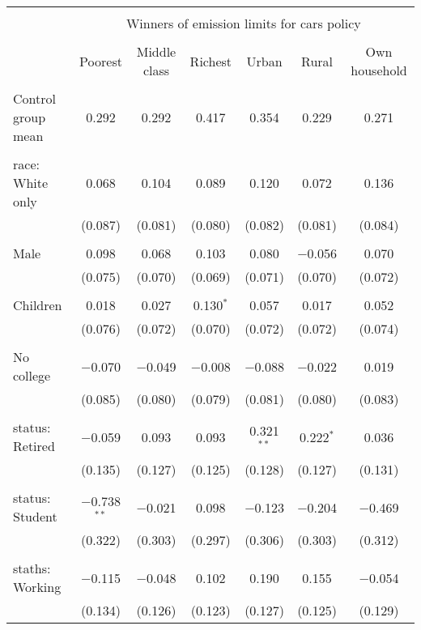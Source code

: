 
\begin{tabular}{@{\extracolsep{5pt}}lcccccc} 
\\[-1.8ex]\hline 
\hline \\[-1.8ex] 
 & \multicolumn{6}{c}{Winners of emission limits for cars policy} \\ 
\cline{2-7} 
\\[-1.8ex] & Poorest & Middle class & Richest & Urban & Rural & Own household \\ 
\hline \\[-1.8ex] 
 Control group mean & 0.292 & 0.292 & 0.417 & 0.354 & 0.229 & 0.271  \\ \hline \\[-1.8ex] race: White only & 0.068 & 0.104 & 0.089 & 0.120 & 0.072 & 0.136 \\ 
  & (0.087) & (0.081) & (0.080) & (0.082) & (0.081) & (0.084) \\ 
  & & & & & & \\ 
 Male & 0.098 & 0.068 & 0.103 & 0.080 & $-$0.056 & 0.070 \\ 
  & (0.075) & (0.070) & (0.069) & (0.071) & (0.070) & (0.072) \\ 
  & & & & & & \\ 
 Children & 0.018 & 0.027 & 0.130$^{*}$ & 0.057 & 0.017 & 0.052 \\ 
  & (0.076) & (0.072) & (0.070) & (0.072) & (0.072) & (0.074) \\ 
  & & & & & & \\ 
 No college & $-$0.070 & $-$0.049 & $-$0.008 & $-$0.088 & $-$0.022 & 0.019 \\ 
  & (0.085) & (0.080) & (0.079) & (0.081) & (0.080) & (0.083) \\ 
  & & & & & & \\ 
 status: Retired & $-$0.059 & 0.093 & 0.093 & 0.321$^{**}$ & 0.222$^{*}$ & 0.036 \\ 
  & (0.135) & (0.127) & (0.125) & (0.128) & (0.127) & (0.131) \\ 
  & & & & & & \\ 
 status: Student & $-$0.738$^{**}$ & $-$0.021 & 0.098 & $-$0.123 & $-$0.204 & $-$0.469 \\ 
  & (0.322) & (0.303) & (0.297) & (0.306) & (0.303) & (0.312) \\ 
  & & & & & & \\ 
 staths: Working & $-$0.115 & $-$0.048 & 0.102 & 0.190 & 0.155 & $-$0.054 \\ 
  & (0.134) & (0.126) & (0.123) & (0.127) & (0.125) & (0.129) \\ 

\end{tabular}
